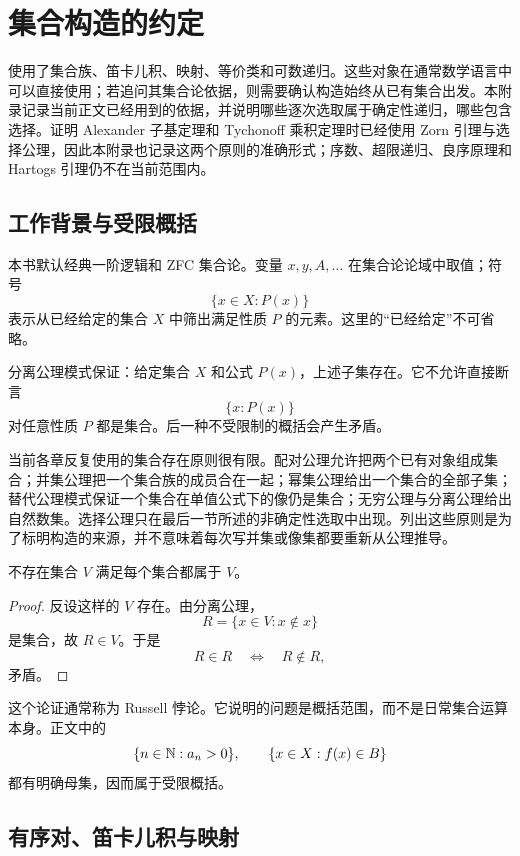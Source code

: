 \chapter{集合构造的约定}
\label{chap:appendix-set-theory}

使用了集合族、笛卡儿积、映射、等价类和可数递归。这些对象在通常数学语言中可以直接使用；若追问其集合论依据，则需要确认构造始终从已有集合出发。本附录记录当前正文已经用到的依据，并说明哪些逐次选取属于确定性递归，哪些包含选择。证明 Alexander 子基定理和 Tychonoff 乘积定理时已经使用 Zorn 引理与选择公理，因此本附录也记录这两个原则的准确形式；序数、超限递归、良序原理和 Hartogs 引理仍不在当前范围内。

\section{工作背景与受限概括}

本书默认经典一阶逻辑和 ZFC 集合论。变量 \(x,y,A,\ldots\) 在集合论论域中取值；符号
\[
 \{x\in X:P(x)\}
\]
表示从已经给定的集合 \(X\) 中筛出满足性质 \(P\) 的元素。这里的“已经给定”不可省略。

分离公理模式保证：给定集合 \(X\) 和公式 \(P(x)\)，上述子集存在。它不允许直接断言
\[
 \{x:P(x)\}
\]
对任意性质 \(P\) 都是集合。后一种不受限制的概括会产生矛盾。

当前各章反复使用的集合存在原则很有限。配对公理允许把两个已有对象组成集合；并集公理把一个集合族的成员合在一起；幂集公理给出一个集合的全部子集；替代公理模式保证一个集合在单值公式下的像仍是集合；无穷公理与分离公理给出自然数集。选择公理只在最后一节所述的非确定性选取中出现。列出这些原则是为了标明构造的来源，并不意味着每次写并集或像集都要重新从公理推导。

\begin{proposition}[不存在所有集合组成的集合]
不存在集合 \(V\) 满足每个集合都属于 \(V\)。
\end{proposition}

\begin{proof}
反设这样的 \(V\) 存在。由分离公理，
\[
 R=\{x\in V:x\notin x\}
\]
是集合，故 \(R\in V\)。于是
\[
 R\in R\quad\Longleftrightarrow\quad R\notin R,
\]
矛盾。
\end{proof}

这个论证通常称为 Russell 悖论。它说明的问题是概括范围，而不是日常集合运算本身。正文中的
\[
 \{n\in\mathbb{N}:a_n>0\},\qquad
 \{x\in X:f(x)\in B\}
\]
都有明确母集，因而属于受限概括。

\section{有序对、笛卡儿积与映射}

